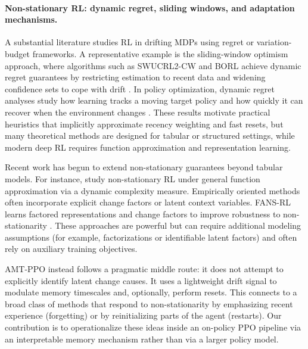 \documentclass{article}
\begin{document}
\paragraph{Non-stationary RL: dynamic regret, sliding windows, and adaptation mechanisms.}
A substantial literature studies RL in drifting MDPs using regret or variation-budget frameworks. A representative example is the sliding-window optimism approach, where algorithms such as SWUCRL2-CW and BORL achieve dynamic regret guarantees by restricting estimation to recent data and widening confidence sets to cope with drift \citep{pmlr-v119-cheung20a}. In policy optimization, dynamic regret analyses study how learning tracks a moving target policy and how quickly it can recover when the environment changes \citep{DBLP:conf/nips/FeiYWX20}. These results motivate practical heuristics that implicitly approximate recency weighting and fast resets, but many theoretical methods are designed for tabular or structured settings, while modern deep RL requires function approximation and representation learning.

Recent work has begun to extend non-stationary guarantees beyond tabular models. For instance, \citet{pmlr-v202-feng23e} study non-stationary RL under general function approximation via a dynamic complexity measure. Empirically oriented methods often incorporate explicit change factors or latent context variables. FANS-RL learns factored representations and change factors to improve robustness to non-stationarity \citep{DBLP:conf/nips/FengH0M22}. These approaches are powerful but can require additional modeling assumptions (for example, factorizations or identifiable latent factors) and often rely on auxiliary training objectives.

AMT-PPO instead follows a pragmatic middle route: it does not attempt to explicitly identify latent change causes. It uses a lightweight drift signal to modulate memory timescales and, optionally, perform resets. This connects to a broad class of methods that respond to non-stationarity by emphasizing recent experience (forgetting) or by reinitializing parts of the agent (restarts). Our contribution is to operationalize these ideas inside an on-policy PPO pipeline via an interpretable memory mechanism rather than via a larger policy model.
\end{document}
